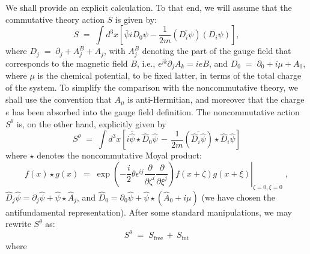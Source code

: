 \documentclass[a4paper,12pt]{article}
\begin{document}
We shall provide an explicit calculation. To that end, we will assume
that the commutative theory action $S$ is given by:
\begin{equation}
S\;=\;\int d^3x \left[ {\bar \psi} i D_0 \psi -\frac{1}{2m}( \overline{D_i \psi})  (D_i \psi) 
\right],
\end{equation}
where $D_j \;=\;\partial_j + A^B_j + A_j$, with $A^B_j$ denoting the part of
the gauge field that corresponds to the magnetic field $B$, i.e.,
$\epsilon^{jk}\partial_j A_k = i e B$, and \mbox{$D_0 \;=\;\partial_0 + i \mu + A_0$}, 
where $\mu$ is the chemical potential, to be fixed latter, in terms of 
the total charge of the system.  To simplify the comparison with the
noncommutative theory, we shall use the convention that $A_\mu$ is
anti-Hermitian, and moreover that the charge $e$ has been absorbed 
into the gauge field definition.
The noncommutative action $S^\theta$ is, on the other hand, explicitly
given by
\begin{equation}
S^\theta\;=\;\int d^3 x \left[ {i \bar {\widehat{\psi}}} \star {\widehat D}_0 
{\widehat \psi} \,-\, 
\frac{1}{2m}  (\overline {{\widehat D}_i {\widehat  \psi}}) \star {\widehat D}_i 
{\widehat \psi} \right]
\end{equation}
where $\star$ denotes the noncommutative Moyal product:
\begin{equation}
\left.  f(x)\star g(x) \;=\; \exp \left( -\frac{i}{2}\theta \epsilon^{ij}
\frac{\partial}{\partial \zeta^i} \frac{\partial}{\partial \xi^j} \right)
f(x+\zeta)g(x+\xi) \right|_{\zeta=0,\xi=0} \;,
\end{equation}
${\widehat D}_j {\widehat \psi} = \partial_j {\widehat \psi} + {\widehat \psi} \star
{\widehat A}_j$, and ${\widehat D}_0 = \partial_0 {\widehat \psi} + {\widehat \psi}
\star ({\widehat A}_0 + i \mu)$ (we have chosen the antifundamental
representation).
After some standard manipulations, we may rewrite $S^\theta$ as:
\begin{equation}
S^\theta\;=\;S_{\mathrm{free}}\,+\,S_{\mathrm{int}}
\end{equation}
where
\end{document}
